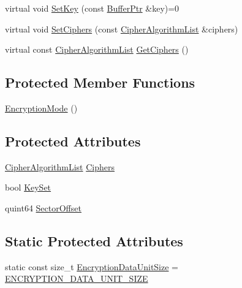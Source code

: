 \begin{DoxyCompactItemize}
\item 
virtual void \hyperlink{class_gost_crypt_1_1_volume_1_1_encryption_mode_a6e612b08918d56e532cca3c5f75ee7d6}{Set\+Key} (const \hyperlink{class_gost_crypt_1_1_buffer_ptr}{Buffer\+Ptr} \&key)=0
\item 
virtual void \hyperlink{class_gost_crypt_1_1_volume_1_1_encryption_mode_a96e5d889932eb1b2a3c657cd409198f6}{Set\+Ciphers} (const \hyperlink{namespace_gost_crypt_1_1_volume_ad32c730cdf3a63d2bafbac0f63f0740f}{Cipher\+Algorithm\+List} \&ciphers)
\item 
virtual const \hyperlink{namespace_gost_crypt_1_1_volume_ad32c730cdf3a63d2bafbac0f63f0740f}{Cipher\+Algorithm\+List} \hyperlink{class_gost_crypt_1_1_volume_1_1_encryption_mode_a9d2af2998bfe7ebd40a369b5452e55c3}{Get\+Ciphers} ()
\end{DoxyCompactItemize}
\subsection*{Protected Member Functions}
\begin{DoxyCompactItemize}
\item 
\hyperlink{class_gost_crypt_1_1_volume_1_1_encryption_mode_aa27ed653c86e69b2c90765a6f6c24927}{Encryption\+Mode} ()
\end{DoxyCompactItemize}
\subsection*{Protected Attributes}
\begin{DoxyCompactItemize}
\item 
\hyperlink{namespace_gost_crypt_1_1_volume_ad32c730cdf3a63d2bafbac0f63f0740f}{Cipher\+Algorithm\+List} \hyperlink{class_gost_crypt_1_1_volume_1_1_encryption_mode_aa1953be4f3d880bc6e2b5d5dc2c5ad97}{Ciphers}
\item 
bool \hyperlink{class_gost_crypt_1_1_volume_1_1_encryption_mode_a261aeaf167fad9fd463868e80c5cbb8c}{Key\+Set}
\item 
quint64 \hyperlink{class_gost_crypt_1_1_volume_1_1_encryption_mode_a57d8ea75f9c561594a39180b95ceaf68}{Sector\+Offset}
\end{DoxyCompactItemize}
\subsection*{Static Protected Attributes}
\begin{DoxyCompactItemize}
\item 
static const size\+\_\+t \hyperlink{class_gost_crypt_1_1_volume_1_1_encryption_mode_a98573f8e36cc4ad1997a23cc56fa30e6}{Encryption\+Data\+Unit\+Size} = \hyperlink{_crypto_8h_a7339cf855afd6ec7616a26b99738e2ed}{E\+N\+C\+R\+Y\+P\+T\+I\+O\+N\+\_\+\+D\+A\+T\+A\+\_\+\+U\+N\+I\+T\+\_\+\+S\+I\+ZE}
\end{DoxyCompactItemize}



